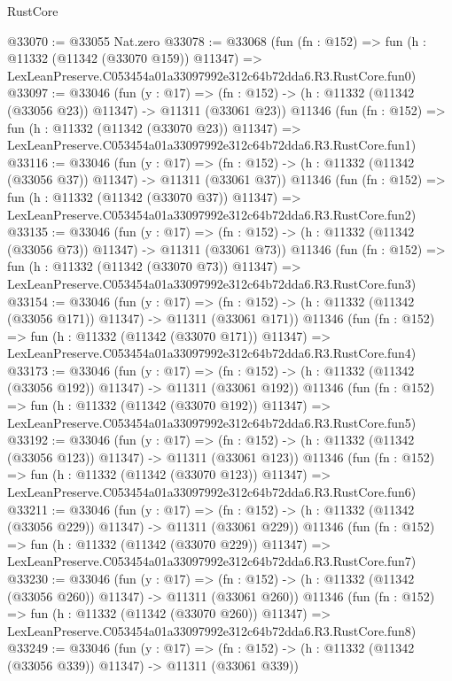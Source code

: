 \begin{lexlean}{RustCore}
\begin{coremodule}
@33070 := @33055 Nat.zero
@33078 := @33068
    (fun (fn : @152) =>
    fun (h : @11332 (@11342 (@33070 @159)) @11347) =>
    LexLeanPreserve.C053454a01a33097992e312c64b72dda6.R3.RustCore.fun0)
@33097 := @33046
    (fun (y : @17) =>
    (fn : @152) -> (h : @11332 (@11342 (@33056 @23)) @11347) -> @11311 (@33061 @23))
    @11346
    (fun (fn : @152) =>
    fun (h : @11332 (@11342 (@33070 @23)) @11347) =>
    LexLeanPreserve.C053454a01a33097992e312c64b72dda6.R3.RustCore.fun1)
@33116 := @33046
    (fun (y : @17) =>
    (fn : @152) -> (h : @11332 (@11342 (@33056 @37)) @11347) -> @11311 (@33061 @37))
    @11346
    (fun (fn : @152) =>
    fun (h : @11332 (@11342 (@33070 @37)) @11347) =>
    LexLeanPreserve.C053454a01a33097992e312c64b72dda6.R3.RustCore.fun2)
@33135 := @33046
    (fun (y : @17) =>
    (fn : @152) -> (h : @11332 (@11342 (@33056 @73)) @11347) -> @11311 (@33061 @73))
    @11346
    (fun (fn : @152) =>
    fun (h : @11332 (@11342 (@33070 @73)) @11347) =>
    LexLeanPreserve.C053454a01a33097992e312c64b72dda6.R3.RustCore.fun3)
@33154 := @33046
    (fun (y : @17) =>
    (fn : @152) -> (h : @11332 (@11342 (@33056 @171)) @11347) -> @11311 (@33061 @171))
    @11346
    (fun (fn : @152) =>
    fun (h : @11332 (@11342 (@33070 @171)) @11347) =>
    LexLeanPreserve.C053454a01a33097992e312c64b72dda6.R3.RustCore.fun4)
@33173 := @33046
    (fun (y : @17) =>
    (fn : @152) -> (h : @11332 (@11342 (@33056 @192)) @11347) -> @11311 (@33061 @192))
    @11346
    (fun (fn : @152) =>
    fun (h : @11332 (@11342 (@33070 @192)) @11347) =>
    LexLeanPreserve.C053454a01a33097992e312c64b72dda6.R3.RustCore.fun5)
@33192 := @33046
    (fun (y : @17) =>
    (fn : @152) -> (h : @11332 (@11342 (@33056 @123)) @11347) -> @11311 (@33061 @123))
    @11346
    (fun (fn : @152) =>
    fun (h : @11332 (@11342 (@33070 @123)) @11347) =>
    LexLeanPreserve.C053454a01a33097992e312c64b72dda6.R3.RustCore.fun6)
@33211 := @33046
    (fun (y : @17) =>
    (fn : @152) -> (h : @11332 (@11342 (@33056 @229)) @11347) -> @11311 (@33061 @229))
    @11346
    (fun (fn : @152) =>
    fun (h : @11332 (@11342 (@33070 @229)) @11347) =>
    LexLeanPreserve.C053454a01a33097992e312c64b72dda6.R3.RustCore.fun7)
@33230 := @33046
    (fun (y : @17) =>
    (fn : @152) -> (h : @11332 (@11342 (@33056 @260)) @11347) -> @11311 (@33061 @260))
    @11346
    (fun (fn : @152) =>
    fun (h : @11332 (@11342 (@33070 @260)) @11347) =>
    LexLeanPreserve.C053454a01a33097992e312c64b72dda6.R3.RustCore.fun8)
@33249 := @33046
    (fun (y : @17) =>
    (fn : @152) -> (h : @11332 (@11342 (@33056 @339)) @11347) -> @11311 (@33061 @339))

\end{coremodule}
\end{lexlean}
